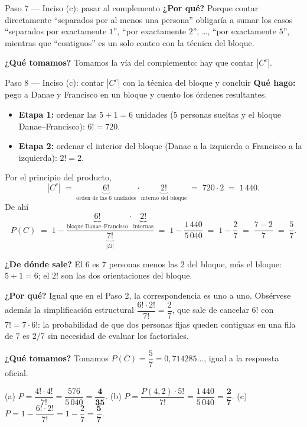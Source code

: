 \documentclass[11pt]{article}
\begin{document}
\begin{sol}
\begin{paso}{Paso 7 --- Inciso (c): pasar al complemento}
\textbf{¿Por qu\'e?} Porque contar directamente ``separados por al menos una persona'' obligar\'ia a sumar los casos ``separados por exactamente $1$'', ``por exactamente $2$'', \dots, ``por exactamente $5$'', mientras que ``contiguos'' es un solo conteo con la t\'ecnica del bloque.

\textbf{¿Qu\'e tomamos?} Tomamos la v\'ia del complemento: hay que contar $|C^{c}|$.
\end{paso}

\begin{paso}{Paso 8 --- Inciso (c): contar $|C^{c}|$ con la t\'ecnica del bloque y concluir}
\textbf{Qu\'e hago:} pego a Danae y Francisco en un bloque y cuento los \'ordenes resultantes.

\begin{itemize}[leftmargin=*]
  \item \textbf{Etapa 1:} ordenar las $5+1=6$ unidades ($5$ personas sueltas y el bloque Danae--Francisco): $6!=720$.
  \item \textbf{Etapa 2:} ordenar el interior del bloque (Danae a la izquierda o Francisco a la izquierda): $2!=2$.
\end{itemize}
Por el principio del producto,
\[
|C^{c}| \;=\; \underbrace{6!}_{\text{orden de las 6 unidades}}\cdot\underbrace{2!}_{\text{interno del bloque}} \;=\; 720\cdot 2 \;=\; 1\,440 .
\]
De ah\'i
\[
P(C)\;=\;1-\frac{\underbrace{6!}_{\text{bloque Danae--Francisco}}\cdot\underbrace{2!}_{\text{internas}}}{\underbrace{7!}_{|\Omega|}}
\;=\;1-\frac{1\,440}{5\,040}\;=\;1-\frac{2}{7}\;=\;\frac{7-2}{7}\;=\;\frac{5}{7}.
\]

\textbf{¿De d\'onde sale?} El $6$ es $7$ personas menos las $2$ del bloque, m\'as el bloque: $5+1=6$; el $2!$ son las dos orientaciones del bloque.

\textbf{¿Por qu\'e?} Igual que en el Paso 2, la correspondencia es uno a uno. Obs\'ervese adem\'as la simplificaci\'on estructural $\dfrac{6!\cdot 2!}{7!}=\dfrac{2}{7}$, que sale de cancelar $6!$ con $7!=7\cdot 6!$: la probabilidad de que dos personas fijas queden contiguas en una fila de $7$ es $2/7$ sin necesidad de evaluar los factoriales.

\textbf{¿Qu\'e tomamos?} Tomamos $P(C)=\dfrac{5}{7}=0{,}714285\ldots$, igual a la respuesta oficial.
\end{paso}

\end{sol}

\begin{resp}
(a) $P=\dfrac{4!\cdot 4!}{7!}=\dfrac{576}{5\,040}=\mathbf{\dfrac{4}{35}}$. \qquad
(b) $P=\dfrac{P(4,2)\cdot 5!}{7!}=\dfrac{1\,440}{5\,040}=\mathbf{\dfrac{2}{7}}$. \qquad
(c) $P=1-\dfrac{6!\cdot 2!}{7!}=1-\dfrac{2}{7}=\mathbf{\dfrac{5}{7}}$.
\end{resp}
\end{document}
